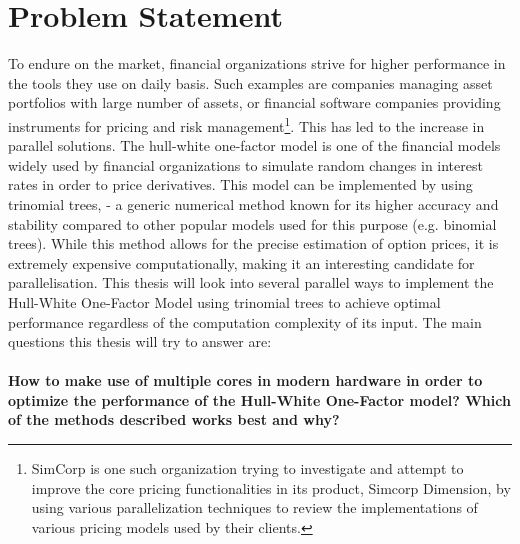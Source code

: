 \section{Problem Statement}
\label{section:problemstatement}
To endure on the market, financial organizations strive for higher performance in the tools they use on daily basis. Such examples are companies managing asset portfolios with large number of assets, or financial software companies providing instruments for pricing and risk management\footnote{SimCorp is one such organization trying to investigate and attempt to improve the core pricing functionalities in its product, Simcorp Dimension, by using various parallelization techniques to review the implementations of various pricing models used by their clients.}. This has led to the increase in parallel solutions. The hull-white one-factor model is one of the financial models widely used by financial organizations to simulate random changes in interest rates in order to price derivatives. This model can be implemented by using trinomial trees\cite[pg. 444]{ofod}, \cite{uhwirt} - a generic numerical method known for its higher accuracy and stability compared to other popular models used for this purpose (e.g. binomial trees). While this method allows for the precise estimation of option prices, it is extremely expensive computationally, making it an interesting candidate for parallelisation. This thesis will look into several parallel ways to implement the Hull-White One-Factor Model using trinomial trees to achieve optimal performance regardless of the computation complexity of its input. The main questions this thesis will try to answer are:\\\\
\textbf{How to make use of multiple cores in modern hardware in order to optimize the performance of the Hull-White One-Factor model? Which of the methods described works best and why?}


